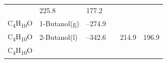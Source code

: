 \documentclass[
]{book}
\theoremstyle{definition}
\theoremstyle{definition}
\theoremstyle{definition}
\theoremstyle{remark}
\begin{document}
\begin{longtable}[]{@{}llllll@{}}
\begin{minipage}[t]{0.15\columnwidth}
\strut
\end{minipage} & \begin{minipage}[t]{0.14\columnwidth}\raggedright
225.8\strut
\end{minipage} & \begin{minipage}[t]{0.14\columnwidth}\raggedright
177.2\strut
\end{minipage}\tabularnewline
\begin{minipage}[t]{0.07\columnwidth}\raggedright
C\textsubscript{4}H\textsubscript{10}O\strut
\end{minipage} & \begin{minipage}[t]{0.17\columnwidth}\raggedright
1-Butanol(g)\strut
\end{minipage} & \begin{minipage}[t]{0.15\columnwidth}\raggedright
--274.9\strut
\end{minipage} & \begin{minipage}[t]{0.15\columnwidth}\raggedright
\strut
\end{minipage} & \begin{minipage}[t]{0.14\columnwidth}\raggedright
\strut
\end{minipage} & \begin{minipage}[t]{0.14\columnwidth}\raggedright
\strut
\end{minipage}\tabularnewline
\begin{minipage}[t]{0.07\columnwidth}\raggedright
C\textsubscript{4}H\textsubscript{10}O\strut
\end{minipage} & \begin{minipage}[t]{0.17\columnwidth}\raggedright
2-Butanol(l)\strut
\end{minipage} & \begin{minipage}[t]{0.15\columnwidth}\raggedright
--342.6\strut
\end{minipage} & \begin{minipage}[t]{0.15\columnwidth}\raggedright
\strut
\end{minipage} & \begin{minipage}[t]{0.14\columnwidth}\raggedright
214.9\strut
\end{minipage} & \begin{minipage}[t]{0.14\columnwidth}\raggedright
196.9\strut
\end{minipage}\tabularnewline
\begin{minipage}[t]{0.07\columnwidth}\raggedright
C\textsubscript{4}H\textsubscript{10}O\strut
\end{minipage} & \begin{minipage}[t]{0.17\columnwidth}\raggedright

\end{minipage}
\end{longtable}
\end{document}
